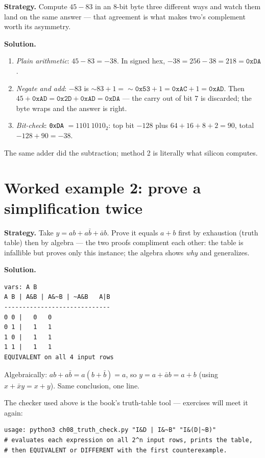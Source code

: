 \textbf{Strategy.} Compute $45 - 83$ in an 8-bit byte three different
ways and watch them land on the same answer — that agreement is what
makes two's complement worth its asymmetry.

\textbf{Solution.}
\begin{enumerate}
\item \emph{Plain arithmetic}: $45-83=-38$. In signed hex,
$-38 = 256-38 = 218 = \texttt{0xDA}$.
\item \emph{Negate and add}: $-83$ is $\sim83+1 = \sim\texttt{0x53}+1 =
\texttt{0xAC}+1=\texttt{0xAD}$. Then $45+\texttt{0xAD} =
\texttt{0x2D}+\texttt{0xAD} = \texttt{0xDA}$ — the carry out of bit 7 is
discarded; the byte wraps and the answer is right.
\item \emph{Bit-check}: \texttt{0xDA} $=1101\,1010_2$: top bit $-128$ plus
$64+16+8+2=90$, total $-128+90=-38$. \checkmark
\end{enumerate}

The same adder did the subtraction; method 2 is literally what silicon
computes.

\section{Worked example 2: prove a simplification twice}
\label{sec:we-simp}

\textbf{Strategy.} Take $y = ab + a\bar b + \bar a b$. Prove it equals
$a+b$ first by exhaustion (truth table) then by algebra — the two proofs
compliment each other: the table is infallible but proves only this
instance; the algebra shows \emph{why} and generalizes.

\textbf{Solution.}
\begin{lstlisting}[caption={Truth-table check via
\texttt{ch08\_truth\_check.py} --- all 4 rows agree.},abovecaptionskip=0pt]
vars: A B
A B | A&B | A&~B | ~A&B   A|B
-----------------------------
0 0 |   0   0
0 1 |   1   1
1 0 |   1   1
1 1 |   1   1
EQUIVALENT on all 4 input rows
\end{lstlisting}

Algebraically: $ab + a\bar b = a(b+\bar b) = a$, so $y = a + \bar a b =
a + b$ (using $x + \bar x y = x + y$). Same conclusion, one line.

The checker used above is the book's truth-table tool — exercises will
meet it again:

\begin{lstlisting}[caption={\ttfamily code/ch08\_truth\_check.py ---
compares expressions exhaustively and prints every row.},
label={lst:tcheck},abovecaptionskip=0pt]
usage: python3 ch08_truth_check.py "I&D | I&~B" "I&(D|~B)"
# evaluates each expression on all 2^n input rows, prints the table,
# then EQUIVALENT or DIFFERENT with the first counterexample.
\end{lstlisting}


